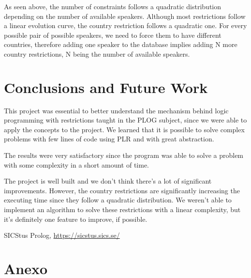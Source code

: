 \documentclass[runningheads,a4paper]{llncs}
\begin{document}
As seen above, the number of constraints follows a quadratic distribution depending on the number of available speakers. Although most restrictions follow a linear evolution curve, the country restriction follows a quadratic one. For every possible pair of possible speakers, we need to force them to have different countries, therefore adding one speaker to the database implies adding N more country restrictions, N being the number of available speakers.

\section{Conclusions and Future Work}
This project was essential to better understand the mechanism behind logic programming with restrictions taught in the PLOG subject, since we were able to apply the concepts to the project. We learned that it is possible to solve complex problems with few lines of code using PLR and with great abstraction.

The results were very satisfactory since the program was able to solve a problem with some complexity in a short amount of time.

The project is well built and we don't think there's a lot of significant improvements. However, the country restrictions are significantly increasing the executing time since they follow a quadratic distribution. We weren't able to implement an algorithm to solve these restrictions with a linear complexity, but it's definitely one feature to improve, if possible.

\begin{thebibliography}{4}
	
	 SICStus Prolog, \url{https://sicstus.sics.se/}
	
\end{thebibliography}  

\clearpage
\section{Anexo}
\end{document}
